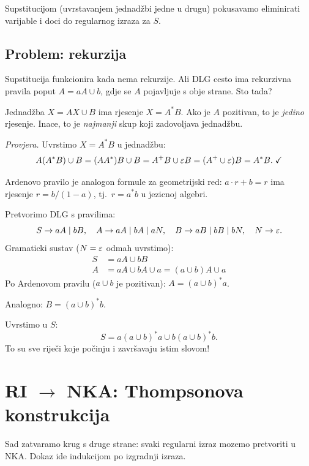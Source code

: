 Supstitucijom (uvrstavanjem jednadžbi jedne u drugu) pokusavamo
eliminirati varijable i doci do regularnog izraza za $S$.

\subsection{Problem: rekurzija}

Supstitucija funkcionira kada nema rekurzije. Ali DLG cesto ima
rekurzivna pravila poput $A = aA \cup b$, gdje se $A$ pojavljuje
s obje strane. Sto tada?

\begin{propozicija}
Jednadžba $X = AX \cup B$ ima rjesenje $X = A^* B$.
Ako je $A$ pozitivan, to je \emph{jedino} rjesenje.
Inace, to je \emph{najmanji} skup koji zadovoljava jednadžbu.
\end{propozicija}

\textit{Provjera.} Uvrstimo $X = A^*B$ u jednadžbu:
\[
  A(A^*B) \cup B = (AA^*)B \cup B = A^+B \cup \varepsilon B = (A^+ \cup \varepsilon)B = A^*B. \; \checkmark
\]

Ardenovo pravilo je analogon formule za geometrijski red:
$a \cdot r + b = r$ ima rjesenje $r = b/(1-a)$, tj.\ $r = a^* b$
u jezicnoj algebri.

\begin{primjer}
Pretvorimo DLG s pravilima:
\[
  S \to aA \mid bB, \quad
  A \to aA \mid bA \mid aN, \quad
  B \to aB \mid bB \mid bN, \quad
  N \to \varepsilon.
\]
Gramaticki sustav ($N = \varepsilon$ odmah uvrstimo):
\begin{align*}
  S &= aA \cup bB \\
  A &= aA \cup bA \cup a = (a \cup b)A \cup a
\end{align*}
Po Ardenovom pravilu ($a \cup b$ je pozitivan):
$A = (a \cup b)^* a$.

Analogno: $B = (a \cup b)^* b$.

Uvrstimo u $S$:
\[
  S = a(a \cup b)^*a \cup b(a \cup b)^*b.
\]
To su sve riječi koje počinju i završavaju istim slovom! \checkmark
\end{primjer}

\section{RI $\to$ NKA: Thompsonova konstrukcija}

Sad zatvaramo krug s druge strane: svaki regularni izraz mozemo
pretvoriti u NKA. Dokaz ide indukcijom po izgradnji izraza.

